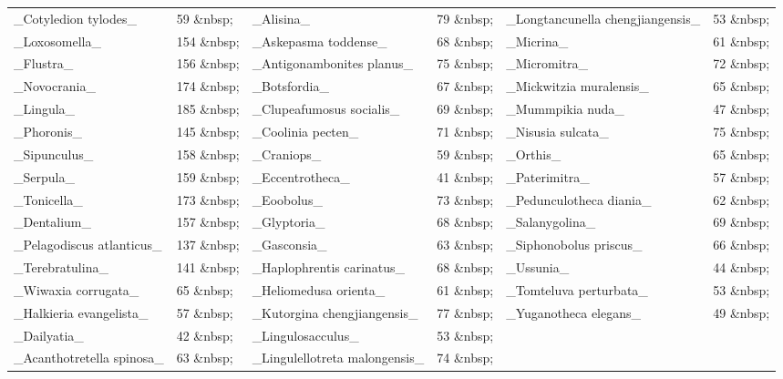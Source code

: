 \documentclass[openany]{book}
\theoremstyle{definition}
\theoremstyle{definition}
\theoremstyle{definition}
\theoremstyle{remark}
\begin{document}
\begin{tabular}{l|l|l|l|l|l}
\hline
 &  &  &  &  & \\
\hline
\_Cotyledion tylodes\_ & 59   \&nbsp; & \_Alisina\_ & 79   \&nbsp; & \_Longtancunella chengjiangensis\_ & 53   \&nbsp;\\
\hline
\_Loxosomella\_ & 154   \&nbsp; & \_Askepasma toddense\_ & 68   \&nbsp; & \_Micrina\_ & 61   \&nbsp;\\
\hline
\_Flustra\_ & 156   \&nbsp; & \_Antigonambonites planus\_ & 75   \&nbsp; & \_Micromitra\_ & 72   \&nbsp;\\
\hline
\_Novocrania\_ & 174   \&nbsp; & \_Botsfordia\_ & 67   \&nbsp; & \_Mickwitzia muralensis\_ & 65   \&nbsp;\\
\hline
\_Lingula\_ & 185   \&nbsp; & \_Clupeafumosus socialis\_ & 69   \&nbsp; & \_Mummpikia nuda\_ & 47   \&nbsp;\\
\hline
\_Phoronis\_ & 145   \&nbsp; & \_Coolinia pecten\_ & 71   \&nbsp; & \_Nisusia sulcata\_ & 75   \&nbsp;\\
\hline
\_Sipunculus\_ & 158   \&nbsp; & \_Craniops\_ & 59   \&nbsp; & \_Orthis\_ & 65   \&nbsp;\\
\hline
\_Serpula\_ & 159   \&nbsp; & \_Eccentrotheca\_ & 41   \&nbsp; & \_Paterimitra\_ & 57   \&nbsp;\\
\hline
\_Tonicella\_ & 173   \&nbsp; & \_Eoobolus\_ & 73   \&nbsp; & \_Pedunculotheca diania\_ & 62   \&nbsp;\\
\hline
\_Dentalium\_ & 157   \&nbsp; & \_Glyptoria\_ & 68   \&nbsp; & \_Salanygolina\_ & 69   \&nbsp;\\
\hline
\_Pelagodiscus atlanticus\_ & 137   \&nbsp; & \_Gasconsia\_ & 63   \&nbsp; & \_Siphonobolus priscus\_ & 66   \&nbsp;\\
\hline
\_Terebratulina\_ & 141   \&nbsp; & \_Haplophrentis carinatus\_ & 68   \&nbsp; & \_Ussunia\_ & 44   \&nbsp;\\
\hline
\_Wiwaxia corrugata\_ & 65   \&nbsp; & \_Heliomedusa orienta\_ & 61   \&nbsp; & \_Tomteluva perturbata\_ & 53   \&nbsp;\\
\hline
\_Halkieria evangelista\_ & 57   \&nbsp; & \_Kutorgina chengjiangensis\_ & 77   \&nbsp; & \_Yuganotheca elegans\_ & 49   \&nbsp;\\
\hline
\_Dailyatia\_ & 42   \&nbsp; & \_Lingulosacculus\_ & 53   \&nbsp; &  & \\
\hline
\_Acanthotretella spinosa\_ & 63   \&nbsp; & \_Lingulellotreta malongensis\_ & 74   \&nbsp; &  & \\
\hline
\end{tabular}
\end{document}
